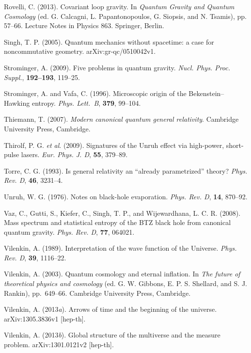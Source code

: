 \documentclass[12pt,a4paper]{article}
\begin{document}
\bibitem{} Rovelli, C. (2013). Covariant loop gravity. In
{\em Quantum Gravity and Quantum Cosmology} (ed.
 G. Calcagni, L. Papantonopoulos, G. Siopsis, and
  N. Tsamis), pp. 57--66.
Lecture Notes in Physics 863. Springer, Berlin.

\bibitem{} Singh, T. P. (2005). Quantum mechanics without
  spacetime: a case for noncommutative geometry.
    arXiv:gr-qc/0510042v1.

\bibitem{} Strominger, A. (2009). Five problems in quantum gravity.
           {\em Nucl. Phys. Proc. Suppl.}, {\bf 192--193}, 119--25.

\bibitem{} Strominger, A. and Vafa, C. (1996). Microscopic origin of the
           Bekenstein--Hawking entropy. {\em Phys. Lett.~B}, {\bf 379},
           99--104.

\bibitem{} Thiemann, T. (2007). {\em Modern canonical 
           quantum general relativity}. Cambridge University Press,
           Cambridge. 

\bibitem{} Thirolf, P. G. {\em et al}. (2009). Signatures of the Unruh
   effect via high-power, short-pulse lasers. {\em Eur. Phys. J. D}, {\bf
   55}, 379--89.

\bibitem{} Torre, C. G. (1993). Is general relativity an 
             ``already parametrized'' theory? {\em Phys. Rev. D}, {\bf 46},
             3231--4.

\bibitem{} Unruh, W. G. (1976). Notes on black-hole evaporation.
           {\em Phys. Rev. D}, {\bf 14}, 870--92. 

\bibitem{} Vaz, C., Gutti, S., Kiefer, C., Singh, T. P., and
           Wijewardhana, L. C. R. (2008).
           Mass spectrum and statistical entropy of the BTZ black hole
           from canonical quantum gravity. 
           {\em Phys. Rev. D}, {\bf 77}, 064021.

\bibitem{} Vilenkin, A. (1989). Interpretation of the wave function of the
           Universe. {\em Phys. Rev. D}, {\bf 39}, 1116--22. 

\bibitem{} Vilenkin, A. (2003). Quantum cosmology and eternal inflation.
           In {\em The future of theoretical physics and cosmology}
           (ed. G. W. Gibbons, E. P. S. Shellard, and S. J. Rankin),
           pp.~649--66. Cambridge University Press, Cambridge.

\bibitem{} Vilenkin, A. (2013{\em a}). Arrows of time and the beginning of
  the universe. arXiv:1305.3836v1 [hep-th].

\bibitem{} Vilenkin, A. (2013{\em b}). Global structure of the
  multiverse and the measure problem.  arXiv:1301.0121v2 [hep-th].
\end{document}

